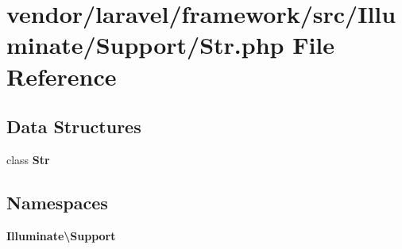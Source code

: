 \section{vendor/laravel/framework/src/\+Illuminate/\+Support/\+Str.php File Reference}
\label{_str_8php}
\subsection*{Data Structures}
\begin{DoxyCompactItemize}
\item 
class {\bf Str}
\end{DoxyCompactItemize}
\subsection*{Namespaces}
\begin{DoxyCompactItemize}
\item 
 {\bf Illuminate\textbackslash{}\+Support}
\end{DoxyCompactItemize}
